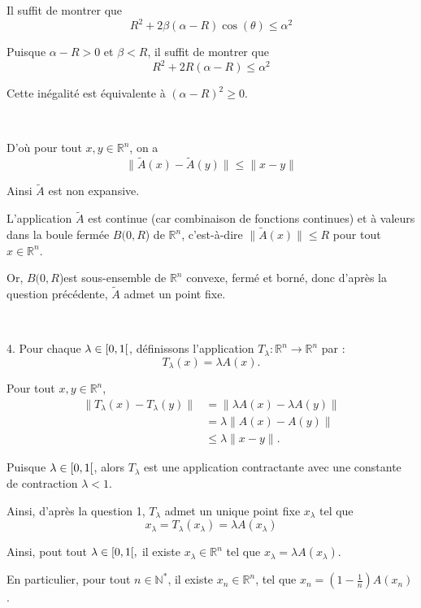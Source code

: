 Il suffit de montrer que
\[ R^2 + 2 \beta (\alpha - R) \cos (\theta) \leqslant \alpha^2 \]


Puisque $\alpha - R > 0$ et $\beta < R$, il suffit de montrer que
\[ R^2 + 2 R (\alpha - R) \leqslant \alpha^2 \]


Cette in{\'e}galit{\'e} est {\'e}quivalente {\`a} $(\alpha - R)^2 \geqslant
0$.

\

D'o{\`u} pour tout $x, y \in \mathbb{R}^n$, on a
\[ \| \tilde{A} (x) - \tilde{A} (y)\| \leqslant \|x - y\| \]


Ainsi $\tilde{A}$ est non expansive.

L'application $\tilde{A}$ est continue (car combinaison de fonctions
continues) et {\`a} valeurs dans la boule ferm{\'e}e $B (0, R$) de
$\mathbb{R}^n$, c'est-{\`a}-dire $\| \tilde{A} (x)\| \leq R$ pour tout $x \in
\mathbb{R}^n$.

Or, $B (0, R$)est sous-ensemble de $\mathbb{R}^n$ convexe, ferm{\'e} et
born{\'e}, donc d'apr{\`e}s la question pr{\'e}c{\'e}dente, $\tilde{A}$ admet
un point fixe.

\

4. Pour chaque $\lambda \in [0, 1 [$, d{\'e}finissons l'application
$T_{\lambda} : \mathbb{R}^n \rightarrow \mathbb{R}^n$ par :
\[ T_{\lambda} (x) = \lambda A (x) . \]


Pour tout $x, y \in \mathbb{R}^n$,
\[ \begin{aligned}
     \|T_{\lambda} (x) - T_{\lambda} (y)\| & =\| \lambda A (x) - \lambda A
     (y)\|\\
     & = \lambda \|A (x) - A (y)\|\\
     & \leq \lambda \|x - y\|.
   \end{aligned} \]


Puisque $\lambda \in [0, 1 [$, alors $T_{\lambda}$ est une
application contractante avec une constante de contraction $\lambda < 1$.

Ainsi, d'apr{\`e}s la question 1, $T_{\lambda}$ admet un unique point fixe
$x_{\lambda}$ tel que
\[ x_{\lambda} = T_{\lambda} (x_{\lambda}) = \lambda A (x_{\lambda}) \]


Ainsi, pout tout $\lambda \in [0, 1 [,$ il existe $x_{\lambda} \in
\mathbb{R}^n$ tel que $x_{\lambda} = \lambda A (x_{\lambda})$.

En particulier, pour tout $n \in \mathbb{N}^{\ast}$, il existe $x_n \in
\mathbb{R}^n$, tel que $x_n = \left( 1 - \frac{1}{n} \right) A (x_n)$.

